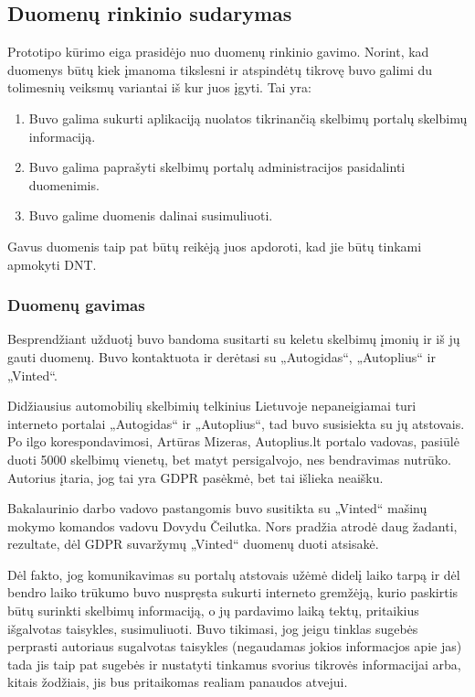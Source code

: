 \documentclass{VUMIFPSkursinis}
\begin{document}
\subsection{Duomenų rinkinio sudarymas}

Prototipo kūrimo eiga prasidėjo nuo duomenų rinkinio gavimo. Norint, kad duomenys būtų kiek įmanoma tikslesni ir atspindėtų tikrovę buvo galimi du tolimesnių veiksmų variantai iš kur juos įgyti. Tai yra:

\begin{enumerate}
  \item Buvo galima sukurti aplikaciją nuolatos tikrinančią skelbimų portalų skelbimų informaciją.
  \item Buvo galima paprašyti skelbimų portalų administracijos pasidalinti duomenimis. 
  \item Buvo galime duomenis dalinai susimuliuoti.
\end{enumerate} 

Gavus duomenis taip pat būtų reikėją juos apdoroti, kad jie būtų tinkami apmokyti DNT.

\subsubsection{Duomenų gavimas}

Besprendžiant užduotį buvo bandoma susitarti su keletu skelbimų įmonių ir iš jų gauti duomenų. Buvo kontaktuota ir derėtasi su „Autogidas“, „Autoplius“ ir „Vinted“.

Didžiausius automobilių skelbimių telkinius Lietuvoje nepaneigiamai turi interneto portalai „Autogidas“ ir „Autoplius“, tad buvo susisiekta su jų atstovais. Po ilgo korespondavimosi, Artūras Mizeras, Autoplius.lt portalo vadovas, pasiūlė duoti 5000 skelbimų vienetų, bet matyt persigalvojo, nes bendravimas nutrūko. Autorius įtaria, jog tai yra GDPR pasėkmė, bet tai išlieka neaišku.

Bakalaurinio darbo vadovo pastangomis buvo susitikta su „Vinted“ mašinų mokymo komandos vadovu Dovydu Čeilutka. Nors pradžia atrodė daug žadanti, rezultate, dėl GDPR suvaržymų „Vinted“ duomenų duoti atsisakė.

Dėl fakto, jog komunikavimas su portalų atstovais užėmė didelį laiko tarpą ir dėl bendro laiko trūkumo buvo nuspręsta sukurti interneto gremžėją, kurio paskirtis būtų surinkti skelbimų informaciją, o jų pardavimo laiką tektų, pritaikius išgalvotas taisykles, susimuliuoti. Buvo tikimasi, jog jeigu tinklas sugebės perprasti autoriaus sugalvotas taisykles (negaudamas jokios informacjos apie jas) tada jis taip pat sugebės ir nustatyti tinkamus svorius tikrovės informacijai arba, kitais žodžiais, jis bus pritaikomas realiam panaudos atvejui.
\end{document}

